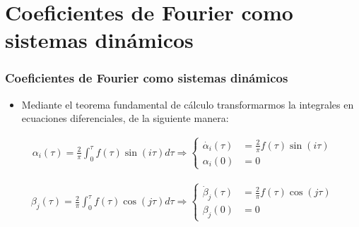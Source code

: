 \section{Coeficientes de Fourier como sistemas dinámicos}
\begin{frame}
    \frametitle{Coeficientes de Fourier como sistemas dinámicos}
    \begin{itemize}
        \item Mediante el teorema fundamental de cálculo transformarmos la integrales en ecuaciones diferenciales, de la siguiente manera:
    \end{itemize}
    \begin{gather}
        \alpha_i(\tau) = \frac{2}{\pi}\int_0^\tau f(\tau) \sin(i\tau)d\tau 
        \Rightarrow
        \begin{cases} \label{ode}
            \dot{\alpha_i}(\tau) & = \frac{2}{\pi}f(\tau)\sin(i\tau) \\  
            \alpha_i(0) & = 0       
        \end{cases}
    \end{gather}
    
    \begin{gather}
        \beta_j(\tau) = \frac{2}{\pi}\int_0^\tau f(\tau) \cos(j\tau)d\tau 
        \Rightarrow
        \begin{cases} \label{ode}
            \dot{\beta}_j(\tau) & = \frac{2}{\pi}f(\tau)\cos(j\tau) \\  
            \beta_j(0) & = 0       
        \end{cases}
    \end{gather}

\end{frame}
